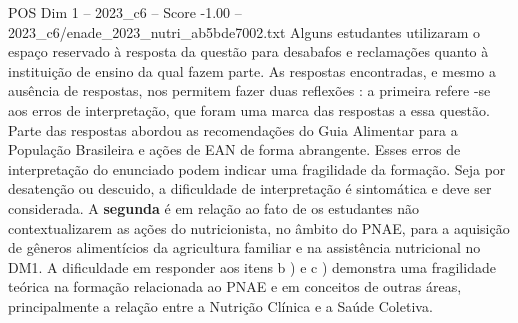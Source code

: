 \begin{textsample}{POS Dim 1 – 2023\_c6 – Score -1.00 – 2023\_c6/enade\_2023\_nutri\_ab5bde7002.txt}
Alguns estudantes utilizaram o espaço reservado à resposta da questão para desabafos e reclamações quanto à instituição de ensino da qual fazem parte.
As respostas encontradas, e mesmo a ausência de respostas, nos permitem fazer duas reflexões : a primeira refere -se aos erros de interpretação, que foram uma marca das respostas a essa questão.
Parte das respostas abordou as recomendações do Guia Alimentar para a População Brasileira e ações de EAN de forma abrangente.
Esses erros de interpretação do enunciado podem indicar uma fragilidade da formação.
Seja por desatenção ou descuido, a dificuldade de interpretação é sintomática e deve ser considerada.
A \textbf{segunda} é em relação ao fato de os estudantes não contextualizarem as ações do nutricionista, no âmbito do PNAE, para a aquisição de gêneros alimentícios da agricultura familiar e na assistência nutricional no DM1.
A dificuldade em responder aos itens b ) e c ) demonstra uma fragilidade teórica na formação relacionada ao PNAE e em conceitos de outras áreas, principalmente a relação entre a Nutrição Clínica e a Saúde Coletiva.

\end{textsample}
